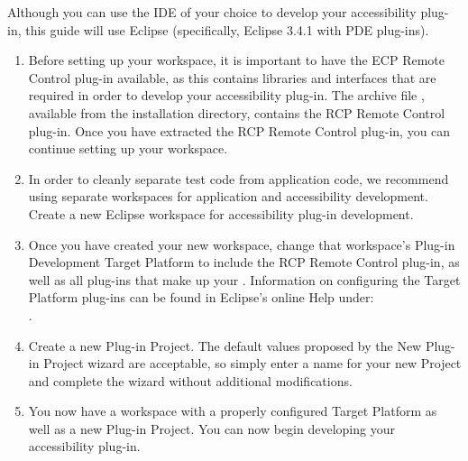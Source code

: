 Although you can use the IDE of your choice to develop your accessibility plug-in, this guide will use Eclipse (specifically, Eclipse 3.4.1 with PDE plug-ins).

\begin{enumerate}
\item Before setting up your workspace, it is important to have the ECP Remote Control plug-in available, as this contains libraries and interfaces that are required in order to develop your accessibility plug-in. The archive file , available from the \app{} installation directory, contains the RCP Remote Control plug-in. Once you have extracted the RCP Remote Control plug-in, you can continue setting up your workspace.

\item In order to cleanly separate test code from application code, we recommend using separate workspaces for application and accessibility development. Create a new Eclipse workspace for accessibility plug-in development. 
\item Once you have created your new workspace, change that workspace's Plug-in Development Target Platform to include the RCP Remote Control plug-in, as well as all plug-ins that make up your \gdaut{}. Information on configuring the Target Platform plug-ins can be found in Eclipse's online Help under:\\
.

\item Create a new Plug-in Project. The default values proposed by the New Plug-in Project wizard are acceptable, so simply enter a name for your new Project and complete the wizard without additional modifications.

\item You now have a workspace with a properly configured Target Platform as well as a new Plug-in Project. You can now begin developing your accessibility plug-in.
\end{enumerate}
